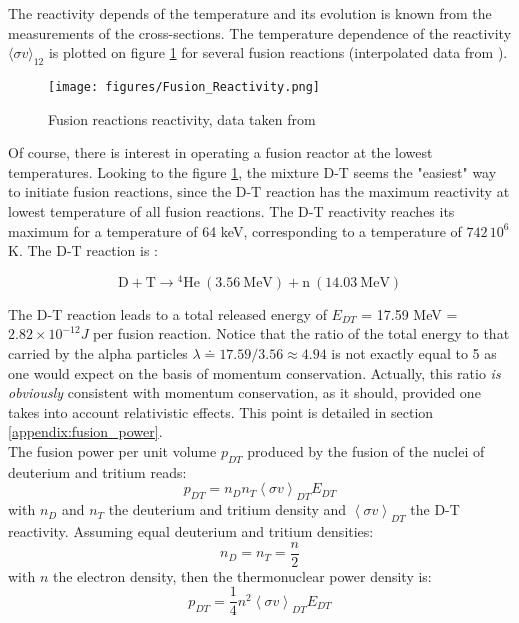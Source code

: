 The reactivity depends of the temperature and its evolution is known from the measurements of the cross-sections. The temperature dependence of the reactivity $\langle \sigma v \rangle_{12}$ is plotted on figure \ref{fig:reactivity_adv} for several fusion reactions (interpolated data from ). 

\begin{figure}
	\texttt{[image: figures/Fusion\_Reactivity.png]}
	\caption{Fusion reactions reactivity, data taken from \cite{Huba2013} }
	\label{fig:reactivity_adv}
\end{figure}

Of course, there is interest in operating a fusion reactor at the lowest temperatures. Looking to the figure \ref{fig:reactivity_adv}, the mixture D-T seems the "easiest" way to initiate fusion reactions, since the D-T reaction  has the maximum reactivity at lowest temperature of all fusion reactions. The D-T reactivity reaches its maximum for a temperature of 64 keV, corresponding to a temperature of $742\,10^6$ K. The D-T reaction is : 

\begin{equation*}
    \mathrm{D + T} \longrightarrow \mathrm{{}^4 He~(3.56~MeV) + n~(14.03~MeV)}
\end{equation*}

The D-T reaction leads to a total released energy of $E_{DT}$ = 17.59 \si{MeV} = $2.82\times 10^{-12} \si{J}$ per fusion reaction. Notice that the ratio of the total energy to that carried by the alpha particles $\lambda \doteq 17.59/3.56 \approx 4.94$ is not exactly equal to 5 as one would expect on the basis of momentum conservation. Actually, this ratio \emph{is obviously} consistent with momentum conservation, as it should, provided one takes into account relativistic effects. This point is detailed in section \ref{appendix:fusion_power}.\\

The fusion power per unit volume $p_{DT}$ produced by the fusion of the nuclei of deuterium and tritium reads: 
\begin{equation*}
  p_{DT} = n_D n_T \left< \sigma v \right>_{DT} E_{DT}
\end{equation*}
with $n_D$ and $n_T$ the deuterium and tritium density and $\left< \sigma v \right>_{DT}$ the D-T reactivity. Assuming equal deuterium and tritium densities:
\begin{equation*}
  n_D = n_T = \frac{n}{2}
\end{equation*}
with $n$ the electron density, then the thermonuclear power density is:
\begin{equation*}
  p_{DT} = \frac{1}{4} n^2 \left< \sigma v \right>_{DT} E_{DT}
\end{equation*}

